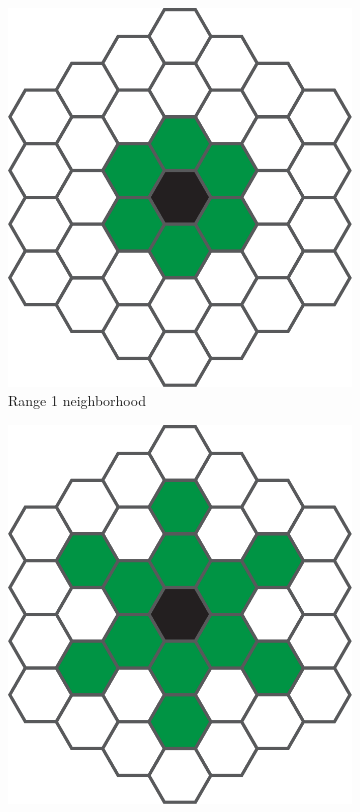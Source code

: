 \begin{figure}[htbp]
  \centering
  \begin{subfigure}[b]{.35\linewidth}
    \centering
    \includegraphics[width=\linewidth]{figures/hexagonal_1}
    \caption{Range 1 neighborhood}
    \label{fig:hexagonal_1}
  \end{subfigure}
  \hspace{10pt}
  \begin{subfigure}[b]{.35\linewidth}
    \centering
    \includegraphics[width=\linewidth]{figures/hexagonal_2}

\end{subfigure}
\end{figure}
